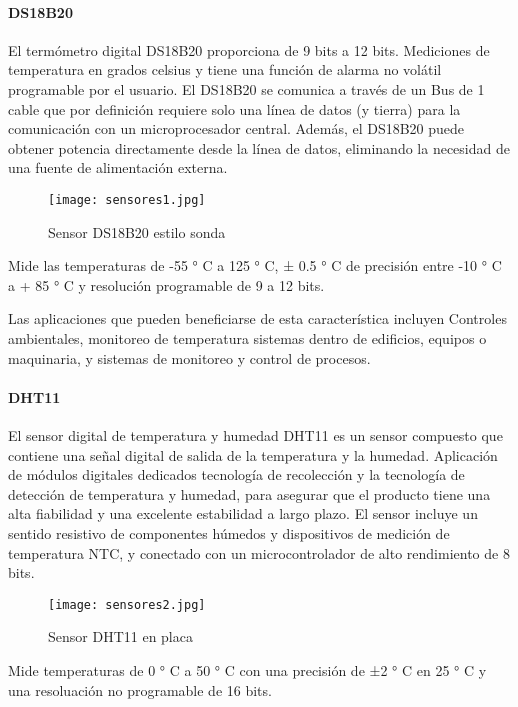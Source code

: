 \paragraph{DS18B20}
El termómetro digital DS18B20 proporciona de 9 bits a 12 bits.
Mediciones de temperatura en grados celsius y tiene una función de alarma no volátil programable por el usuario. El DS18B20 se comunica a través de un Bus de 1 cable que por definición requiere solo una línea de datos (y tierra) para la comunicación con un microprocesador central. Además, el DS18B20 puede obtener potencia directamente desde la línea de datos, eliminando la necesidad de una fuente de alimentación externa\cite{ds18b20}.

\begin{figure}[H]
	\centering
	\texttt{[image: sensores1.jpg]}
	\caption{Sensor DS18B20 estilo sonda}
\end{figure}

\par \noindent
Mide las temperaturas de -55 ° C a 125 ° C, ± 0.5 ° C de  precisión entre -10 ° C a + 85 ° C y resolución programable de 9 a 12 bits.

\par \noindent
Las aplicaciones que pueden beneficiarse de esta característica incluyen
Controles ambientales, monitoreo de temperatura
sistemas dentro de edificios, equipos o maquinaria, y
sistemas de monitoreo y control de procesos\cite{ds18b20}. 


\paragraph{DHT11}
El sensor digital de temperatura y humedad DHT11 es un sensor compuesto que contiene una
señal digital de salida de la temperatura y la humedad. Aplicación de módulos digitales dedicados
tecnología de recolección y la tecnología de detección de temperatura y humedad, para asegurar que
el producto tiene una alta fiabilidad y una excelente estabilidad a largo plazo. El sensor incluye un sentido resistivo
de componentes húmedos y dispositivos de medición de temperatura NTC, y conectado con un
microcontrolador de alto rendimiento de 8 bits\cite{dht11}.

\begin{figure}[H]
	\centering
	\texttt{[image: sensores2.jpg]}
	\caption{Sensor DHT11 en placa}
\end{figure}

\par \noindent
Mide temperaturas de 0 ° C a 50 ° C con una precisión de ±2 ° C en 25 ° C y una resoluación no programable de 16 bits.

